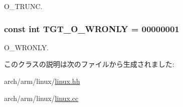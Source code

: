 O\_\-TRUNC. \hypertarget{classArmLinux32_a6156c069cefe05ce3cce033b2e0c2de2}{
\subsubsection[{TGT\_\-O\_\-WRONLY}]{\setlength{\rightskip}{0pt plus 5cm}const int {\bf TGT\_\-O\_\-WRONLY} = 00000001}}
\label{classArmLinux32_a6156c069cefe05ce3cce033b2e0c2de2}


O\_\-WRONLY. 

このクラスの説明は次のファイルから生成されました:\begin{DoxyCompactItemize}
\item 
arch/arm/linux/\hyperlink{arch_2arm_2linux_2linux_8hh}{linux.hh}\item 
arch/arm/linux/\hyperlink{arch_2arm_2linux_2linux_8cc}{linux.cc}\end{DoxyCompactItemize}
